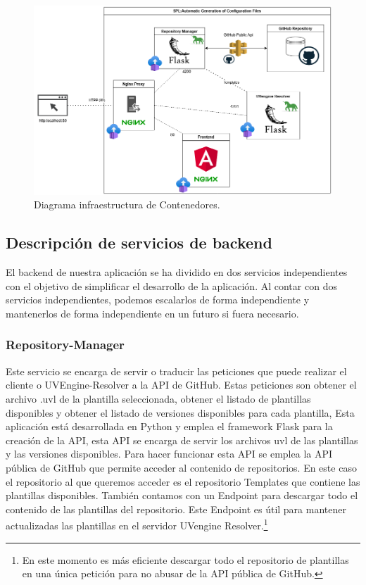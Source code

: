 \documentclass[12pt, a4paper, twoside]{article}
\begin{document}
\begin{figure}[h]
	\centering
	  \includegraphics[width=1\textwidth]{Arquitectura Contenedores.png}
	\caption{Diagrama infraestructura de Contenedores.}
\end{figure}

\newpage
\subsection{Descripción de servicios de backend} 
El backend de nuestra aplicación se ha dividido en dos servicios independientes con el objetivo de simplificar el desarrollo de la aplicación.
Al contar con dos servicios independientes, podemos escalarlos de forma independiente y mantenerlos de forma independiente en un futuro si fuera necesario.


\subsubsection{Repository-Manager}
Este servicio se encarga de servir o traducir las peticiones que puede realizar el cliente o UVEngine-Resolver a la API de GitHub.
Estas peticiones son obtener el archivo .uvl de la plantilla seleccionada, obtener el listado de plantillas disponibles y obtener el listado de versiones disponibles para cada plantilla,
Esta aplicación está desarrollada en Python y emplea el framework Flask para la creación de la API, esta API se encarga de servir los archivos uvl de las plantillas y las versiones disponibles.
Para hacer funcionar esta API se emplea la API pública de GitHub que permite acceder al contenido de repositorios. 
En este caso el repositorio al que queremos acceder es el repositorio Templates \cite{m4rdom_templates} que contiene las plantillas disponibles.
También contamos con un Endpoint para descargar todo el contenido de las plantillas del repositorio. Este Endpoint es útil para mantener actualizadas las plantillas en el servidor UVengine Resolver.\footnote{En este momento es más eficiente descargar todo el repositorio de plantillas en una única petición para no abusar de la API pública de GitHub.}
\end{document}

